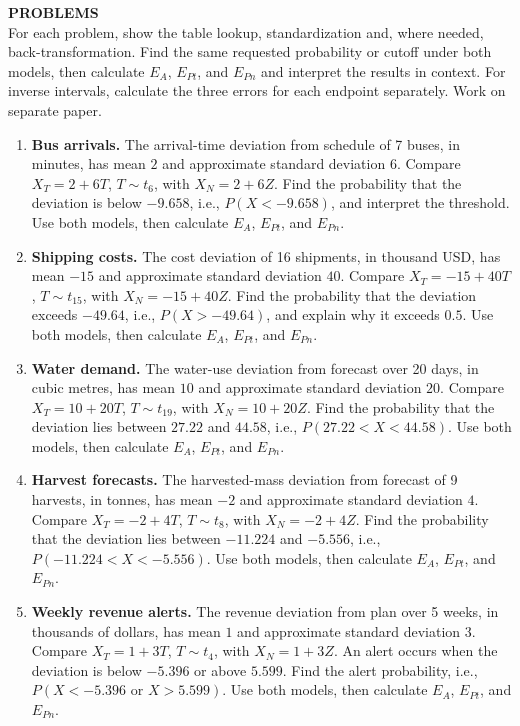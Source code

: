 	\textbf{PROBLEMS}\\
	For each problem, show the table lookup, standardization and, where needed, back-transformation. Find the same requested probability or cutoff under both models, then calculate $E_A$, $E_{Pt}$, and $E_{Pn}$ and interpret the results in context. For inverse intervals, calculate the three errors for each endpoint separately. Work on separate paper.
	\begin{enumerate}[leftmargin=*,label=\textbf{\arabic*.},itemsep=5pt,parsep=0pt,topsep=2pt]
		\item \textbf{Bus arrivals.} The arrival-time deviation from schedule of 7 buses, in minutes, has mean $2$ and approximate standard deviation $6$. Compare $X_T=2+6T$, $T\sim t_{6}$, with $X_N=2+6Z$. Find the probability that the deviation is below $-9.658$, i.e., $P(X<-9.658)$, and interpret the threshold. Use both models, then calculate $E_A$, $E_{Pt}$, and $E_{Pn}$.
		\item \textbf{Shipping costs.} The cost deviation of 16 shipments, in thousand USD, has mean $-15$ and approximate standard deviation $40$. Compare $X_T=-15+40T$, $T\sim t_{15}$, with $X_N=-15+40Z$. Find the probability that the deviation exceeds $-49.64$, i.e., $P(X>-49.64)$, and explain why it exceeds $0.5$. Use both models, then calculate $E_A$, $E_{Pt}$, and $E_{Pn}$.
		\item \textbf{Water demand.} The water-use deviation from forecast over 20 days, in cubic metres, has mean $10$ and approximate standard deviation $20$. Compare $X_T=10+20T$, $T\sim t_{19}$, with $X_N=10+20Z$. Find the probability that the deviation lies between $27.22$ and $44.58$, i.e., $P(27.22<X<44.58)$. Use both models, then calculate $E_A$, $E_{Pt}$, and $E_{Pn}$.
		\item \textbf{Harvest forecasts.} The harvested-mass deviation from forecast of 9 harvests, in tonnes, has mean $-2$ and approximate standard deviation $4$. Compare $X_T=-2+4T$, $T\sim t_{8}$, with $X_N=-2+4Z$. Find the probability that the deviation lies between $-11.224$ and $-5.556$, i.e., $P(-11.224<X<-5.556)$. Use both models, then calculate $E_A$, $E_{Pt}$, and $E_{Pn}$.
		\item \textbf{Weekly revenue alerts.} The revenue deviation from plan over 5 weeks, in thousands of dollars, has mean $1$ and approximate standard deviation $3$. Compare $X_T=1+3T$, $T\sim t_{4}$, with $X_N=1+3Z$. An alert occurs when the deviation is below $-5.396$ or above $5.599$. Find the alert probability, i.e., $P(X<-5.396\text{ or }X>5.599)$. Use both models, then calculate $E_A$, $E_{Pt}$, and $E_{Pn}$.

\end{enumerate}
